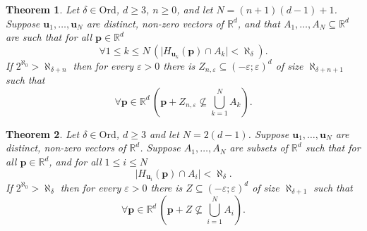 \documentclass[10pt,a4paper]{amsart}
\newtheorem{theorem}{Theorem}
\newcommand{\FORALL}[1]{\forall {#1} \, }
\newcommand{\On}{\mathord{\mathrm{Ord}}}		%
\newcommand{\R}{\mathbb{R}}	%
\newcommand{\card}[1]{\mathopen | #1 \mathclose |}		%
\begin{document}
\begin{theorem}\label{th:hyperplanes=>bound}
Let \( \delta \in \On \), \( d \geq 3 \), \( n \geq 0 \), and let \( N = ( n + 1 ) ( d - 1 ) + 1 \).
Suppose \( \mathbf{u}_1 , \dots , \mathbf{u}_N \) are distinct, non-zero vectors of \( \R^d \), and that \( A_1 , \dots , A_ N \subseteq \R^d \) are such that for all \( \mathbf{p} \in \R^d \)
\[
 \FORALL{ 1 \leq k \leq N} \left ( \card{ H_{\mathbf{u}_k } ( \mathbf{p} ) \cap A_k } < \aleph_ \delta \right ) .
\]
If \( 2^{\aleph_0} > \aleph_{ \delta + n } \) then for every \( \varepsilon > 0 \) there is \( Z_{ n , \varepsilon } \subseteq ( - \varepsilon ; \varepsilon )^d \) of size \( \aleph_{ \delta + n + 1} \) such that 
\[ 
 \FORALL{ \mathbf{p} \in \R^d } \left ( \mathbf{p} + Z_{ n , \varepsilon } \nsubseteq \textstyle \bigcup_{ k = 1 }^N A_k \right ) . 
\]
\end{theorem}

\begin{theorem}\label{th:EJM-Rd}
Let \( \delta \in \On \), \( d \geq 3 \) and let \( N = 2 ( d - 1 ) \).
Suppose \( \mathbf{u}_1 , \dots , \mathbf{u}_N \) are distinct, non-zero vectors of \( \R^d \).
Suppose \( A_1 , \dots , A_N \) are subsets of \( \R^d \) such that for all \( \mathbf{p} \in \R^d \), and for all \( 1 \leq i \leq N \)
\[
\card{ H_{\mathbf{u}_i} ( \mathbf{p} ) \cap A_i } < \aleph_ \delta . 
\]
If \( 2^{\aleph_0 } > \aleph_{ \delta } \) then for every \( \varepsilon > 0 \) there is \( Z \subseteq ( - \varepsilon ; \varepsilon ) ^ d \) of size \( \aleph_{ \delta + 1 } \) such that 
\[
\FORALL{ \mathbf{p} \in \R^d } ( \mathbf{p} + Z \nsubseteq \textstyle \bigcup_{i = 1 }^N A_i ) . 
\]
\end{theorem}
\end{document}
